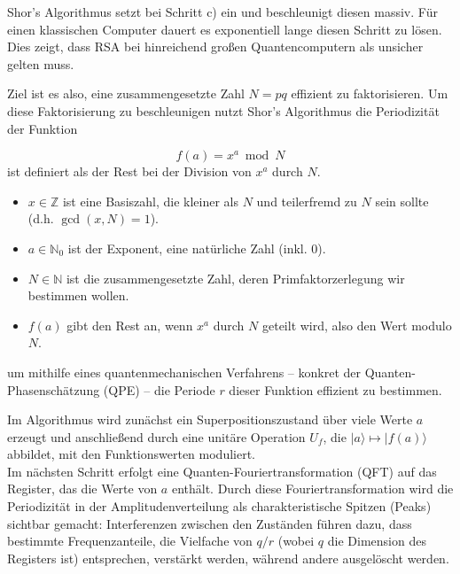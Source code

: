{Shor's Algorithmus setzt bei Schritt c) ein und beschleunigt diesen massiv. Für einen klassischen Computer dauert es exponentiell lange diesen Schritt zu lösen. Dies zeigt, dass RSA bei hinreichend großen Quantencomputern als unsicher gelten muss.

Ziel ist es also, eine zusammengesetzte Zahl \( N = pq \) effizient zu faktorisieren. Um diese Faktorisierung zu beschleunigen nutzt Shor's Algorithmus die Periodizität der Funktion

\begin{definition} 
\[
f(a) = x^a \bmod N
\]
ist definiert als der Rest bei der Division von \(x^a\) durch \(N\).

\begin{itemize}
    \item \(x \in \mathbb{Z}\) ist eine Basiszahl, die kleiner als \(N\) und teilerfremd zu \(N\) sein sollte (d.h. \(\gcd(x, N) = 1\)).
    \item \(a \in \mathbb{N}_0\) ist der Exponent, eine natürliche Zahl (inkl. 0).
    \item \(N \in \mathbb{N}\) ist die zusammengesetzte Zahl, deren Primfaktorzerlegung wir bestimmen wollen.
    \item \(f(a)\) gibt den Rest an, wenn \(x^a\) durch \(N\) geteilt wird, also den Wert modulo \(N\).
\end{itemize}
\end{definition}
um mithilfe eines quantenmechanischen Verfahrens – konkret der Quanten-\\Phasenschätzung (QPE) – die Periode \( r \) dieser Funktion effizient zu bestimmen.

Im Algorithmus wird zunächst ein Superpositionszustand über viele Werte \( a \) erzeugt und anschließend durch eine unitäre Operation \( U_f \), die \( |a\rangle \mapsto |f(a)\rangle \) abbildet, mit den Funktionswerten moduliert.\\

Im nächsten Schritt erfolgt eine Quanten-Fouriertransformation (QFT) auf das Register, das die Werte von \( a \) enthält. Durch diese Fouriertransformation wird die Periodizität in der Amplitudenverteilung als charakteristische Spitzen (Peaks) sichtbar gemacht: Interferenzen zwischen den Zuständen führen dazu, dass bestimmte Frequenzanteile, die Vielfache von \( q/r \) (wobei \( q \) die Dimension des Registers ist) entsprechen, verstärkt werden, während andere ausgelöscht werden.\\

}
